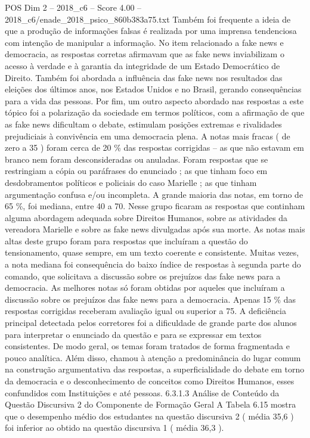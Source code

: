 \begin{textsample}{POS Dim 2 – 2018\_c6 – Score 4.00 – 2018\_c6/enade\_2018\_psico\_860b383a75.txt}
Também foi frequente a ideia de que a produção de informações falsas é realizada por uma imprensa tendenciosa com intenção de manipular a informação.
No item relacionado a fake news e democracia, as respostas corretas afirmavam que as fake news inviabilizam o acesso à verdade e à garantia da integridade de um Estado Democrático de Direito.
Também foi abordada a influência das fake news nos resultados das eleições dos últimos anos, nos Estados Unidos e no Brasil, gerando consequências para a vida das pessoas.
Por fim, um outro aspecto abordado nas respostas a este tópico foi a polarização da sociedade em termos políticos, com a afirmação de que as fake news dificultam o debate, estimulam posições extremas e rivalidades prejudiciais à convivência em uma democracia plena.
A notas mais fracas ( de zero a 35 ) foram cerca de 20 \% das respostas corrigidas – as que não estavam em branco nem foram desconsideradas ou anuladas.
Foram respostas que se restringiam a cópia ou paráfrases do enunciado ; as que tinham foco em desdobramentos políticos e policiais do caso Marielle ; as que tinham argumentação confusa e/ou incompleta.
A grande maioria das notas, em torno de 65 \%, foi mediana, entre 40 a 70.
Nesse grupo ficaram as respostas que continham alguma abordagem adequada sobre Direitos Humanos, sobre as atividades da vereadora Marielle e sobre as fake news divulgadas após sua morte.
As notas mais altas deste grupo foram para respostas que incluíram a questão do tensionamento, quase sempre, em um texto coerente e consistente.
Muitas vezes, a nota mediana foi consequência do baixo índice de respostas à segunda parte do comando, que solicitava a discussão sobre os prejuízos das fake news para a democracia.
As melhores notas só foram obtidas por aqueles que incluíram a discussão sobre os prejuízos das fake news para a democracia.
Apenas 15 \% das respostas corrigidas receberam avaliação igual ou superior a 75.
A deficiência principal detectada pelos corretores foi a dificuldade de grande parte dos alunos para interpretar o enunciado da questão e para se expressar em textos consistentes.
De modo geral, os temas foram tratados de forma fragmentada e pouco analítica.
Além disso, chamou à atenção a predominância do lugar comum na construção argumentativa das respostas, a superficialidade do debate em torno da democracia e o desconhecimento de conceitos como Direitos Humanos, esses confundidos com Instituições e até pessoas. 6.3.1.3 Análise de Conteúdo da Questão Discursiva 2 do Componente de Formação Geral A Tabela 6.15 mostra que o desempenho médio dos estudantes na questão discursiva 2 ( média 35,6 ) foi inferior ao obtido na questão discursiva 1 ( média 36,3 ).

\end{textsample}
